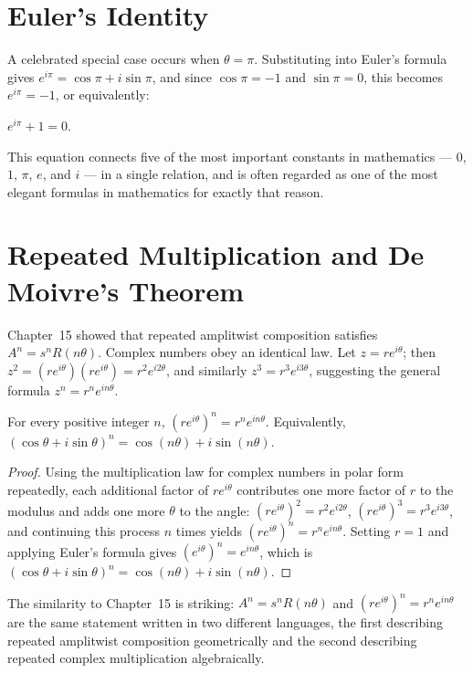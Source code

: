 \section{Euler's Identity}

A celebrated special case occurs when $\theta = \pi$. Substituting into
Euler's formula gives $e^{i\pi} = \cos\pi + i\sin\pi$, and since $\cos\pi
= -1$ and $\sin\pi = 0$, this becomes $e^{i\pi} = -1$, or equivalently:

\begin{theorem}
$e^{i\pi} + 1 = 0$.
\end{theorem}

This equation connects five of the most important constants in
mathematics --- $0$, $1$, $\pi$, $e$, and $i$ --- in a single relation,
and is often regarded as one of the most elegant formulas in mathematics
for exactly that reason.

\section{Repeated Multiplication and De Moivre's Theorem}

Chapter~15 showed that repeated amplitwist composition satisfies $A^n =
s^nR(n\theta)$. Complex numbers obey an identical law. Let $z =
re^{i\theta}$; then $z^2 = (re^{i\theta})(re^{i\theta}) = r^2e^{i2\theta}$,
and similarly $z^3 = r^3e^{i3\theta}$, suggesting the general formula $z^n
= r^ne^{in\theta}$.

\begin{theorem}
For every positive integer $n$, $(re^{i\theta})^n = r^ne^{in\theta}$.
Equivalently, $(\cos\theta+i\sin\theta)^n = \cos(n\theta)+i\sin(n\theta)$.
\end{theorem}

\begin{proof}
Using the multiplication law for complex numbers in polar form
repeatedly, each additional factor of $re^{i\theta}$ contributes one more
factor of $r$ to the modulus and adds one more $\theta$ to the angle:
$(re^{i\theta})^2 = r^2e^{i2\theta}$, $(re^{i\theta})^3 = r^3e^{i3\theta}$,
and continuing this process $n$ times yields $(re^{i\theta})^n =
r^ne^{in\theta}$. Setting $r=1$ and applying Euler's formula gives
$(e^{i\theta})^n = e^{in\theta}$, which is
$(\cos\theta+i\sin\theta)^n = \cos(n\theta)+i\sin(n\theta)$.
\end{proof}

The similarity to Chapter~15 is striking: $A^n = s^nR(n\theta)$ and
$(re^{i\theta})^n = r^ne^{in\theta}$ are the same statement written in
two different languages, the first describing repeated amplitwist
composition geometrically and the second describing repeated complex
multiplication algebraically.

